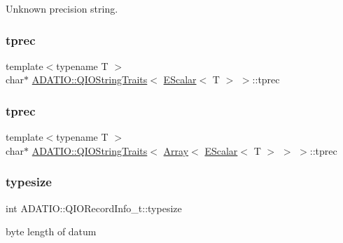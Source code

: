 Unknown precision string. 

\mbox{\label{group__qio_ga44058d03fc17a4d1cee98691456d4ae9}} 
\subsubsection{\texorpdfstring{tprec}{tprec}\hspace{0.1cm}{\footnotesize\ttfamily [2/3]}}
{\footnotesize\ttfamily template$<$typename T $>$ \\
char$\ast$ \mbox{\hyperlink{structADATIO_1_1QIOStringTraits}{A\+D\+A\+T\+I\+O\+::\+Q\+I\+O\+String\+Traits}}$<$ \mbox{\hyperlink{classENSEM_1_1EScalar}{E\+Scalar}}$<$ T $>$ $>$\+::tprec\hspace{0.3cm}{\ttfamily [static]}}

\mbox{\label{group__qio_ga7ca53c00705c98636d0eb04347851f07}} 
\subsubsection{\texorpdfstring{tprec}{tprec}\hspace{0.1cm}{\footnotesize\ttfamily [3/3]}}
{\footnotesize\ttfamily template$<$typename T $>$ \\
char$\ast$ \mbox{\hyperlink{structADATIO_1_1QIOStringTraits}{A\+D\+A\+T\+I\+O\+::\+Q\+I\+O\+String\+Traits}}$<$ \mbox{\hyperlink{classXMLArray_1_1Array}{Array}}$<$ \mbox{\hyperlink{classENSEM_1_1EScalar}{E\+Scalar}}$<$ T $>$ $>$ $>$\+::tprec\hspace{0.3cm}{\ttfamily [static]}}

\mbox{\label{group__qio_ga415fb0076e8a07dddb97c8c5d6ea08f9}} 
\subsubsection{\texorpdfstring{typesize}{typesize}}
{\footnotesize\ttfamily int A\+D\+A\+T\+I\+O\+::\+Q\+I\+O\+Record\+Info\+\_\+t\+::typesize}

byte length of datum 